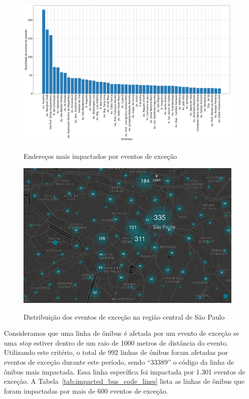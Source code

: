\documentclass[
	12pt,				%
	oneside,			%
	a4paper,			%
	english,			%
	brazil				%
	]{abntex2ppgsi}
\begin{document}
{{{\begin{figure}[!htb]
	\centering
 	  \caption{Endereços mais impactados por eventos de exceção}
		\includegraphics[width=1\linewidth]{images/address_analysis_pt.png}
	\label{fig:address_analysis}
\end{figure}

\begin{figure}[!htb]
	\centering
 	  \caption{Distribuição dos eventos de exceção na região central de São Paulo}
		\includegraphics[width=1\linewidth]{images/exception_events_sp.png}
	\label{fig:dispersion}
\end{figure}

Consideramos que uma linha de ônibus é afetada por um evento de exceção se uma \textit{stop} estiver dentro de um raio de 1000 metros de distância do evento. Utilizando este critério, o total de 992 linhas de ônibus foram afetadas por eventos de exceção durante este período, sendo ``33389'' o código da linha de ônibus mais impactada. Essa linha específica foi impactada por 1.301 eventos de exceção. A Tabela~\ref{tab:impacted_bus_code_lines} lista as linhas de ônibus que foram impactadas por mais de 600 eventos de exceção.

}}}
\end{document}
